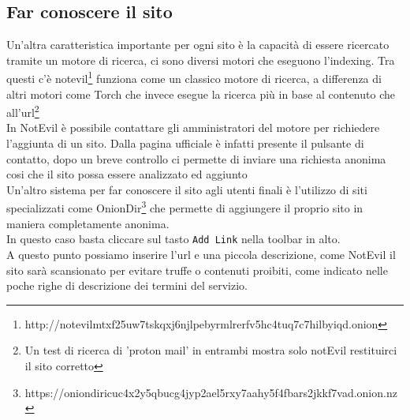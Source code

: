 
\newpage

\subsection{Far conoscere il sito}
Un'altra caratteristica importante per ogni sito è la capacità di essere ricercato tramite un motore di ricerca, ci sono diversi motori che eseguono l'indexing. Tra questi c'è notevil\footnote{http://notevilmtxf25uw7tskqxj6njlpebyrmlrerfv5hc4tuq7c7hilbyiqd.onion} funziona come un classico motore di ricerca, a differenza di altri motori come Torch che invece esegue la ricerca più in base al contenuto che all'url\footnote{Un test di ricerca di 'proton mail' in entrambi mostra solo notEvil restituirci il sito corretto} \\
In NotEvil è possibile contattare gli amministratori del motore per richiedere l'aggiunta di un sito. Dalla pagina ufficiale è infatti presente il pulsante di contatto, dopo un breve controllo ci permette di inviare una richiesta anonima cosi che il sito possa essere analizzato ed aggiunto\\
Un'altro sistema per far conoscere il sito agli utenti finali è l'utilizzo di siti specializzati come OnionDir\footnote{https://oniondiricuc4x2y5qbucg4jyp2ael5rxy7aahy5f4fbars2jkkf7vad.onion.nz} che permette di aggiungere il proprio sito in maniera completamente anonima. \\
In questo caso basta cliccare sul tasto \lstinline{Add Link} nella toolbar in alto. \\
A questo punto possiamo inserire l'url e una piccola descrizione, come NotEvil il sito sarà scansionato per evitare truffe o contenuti proibiti, come indicato nelle poche righe di descrizione dei termini del servizio. \\
